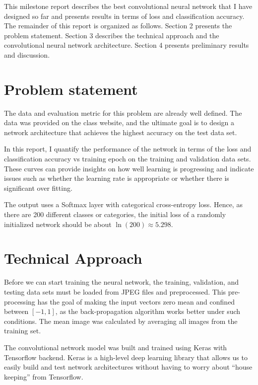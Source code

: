 \documentclass[10pt,twocolumn,letterpaper]{article}
\begin{document}
This milestone report describes the best convolutional neural network that I have designed so far and presents results in terms of loss and classification accuracy. The remainder of this report is organized as follows. Section 2 presents the problem statement. Section 3 describes the technical approach and the convolutional neural network architecture. Section 4 presents preliminary results and discussion.

\section{Problem statement}
The data and evaluation metric for this problem are already well defined. The data was provided on the class website, and the ultimate goal is to design a network architecture that achieves the highest accuracy on the test data set. 

In this report, I quantify the performance of the network in terms of the loss and classification accuracy vs training epoch on the training and validation data sets. These curves can provide insights on how well learning is progressing and indicate issues such as whether the learning rate is appropriate or whether there is significant over fitting. 

The output uses a Softmax layer with categorical cross-entropy loss. Hence, as there are 200 different classes or categories, the initial loss of a randomly initialized network should be about $\ln(200) \approx 5.298$.  

\section{Technical Approach}

Before we can start training the neural network, the training, validation, and testing data sets must be loaded from JPEG files and preprocessed. This pre-processing has the goal of making the input vectors zero mean and confined between $[-1, 1]$, as the back-propagation algorithm works better under such conditions. The mean image was calculated by averaging all images from the training set. 

The convolutional network model was built and trained using Keras \cite{keras} with Tensorflow backend. Keras is a high-level deep learning library that allows us to easily build and test network architectures without having to worry about ``house keeping'' from Tensorflow. 
\end{document}
